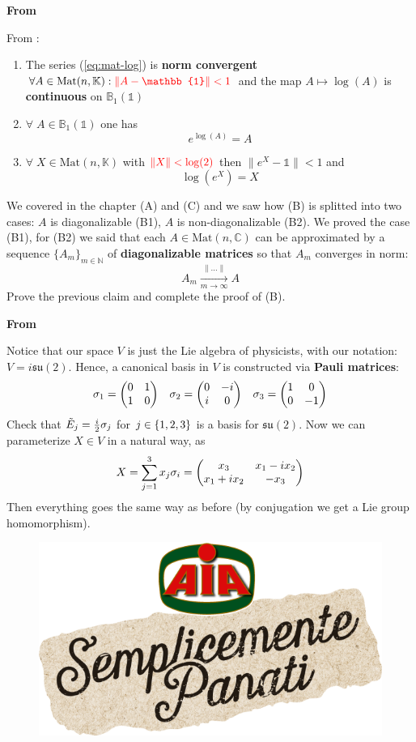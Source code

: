 \documentclass[../main.tex]{subfiles}
\begin{document}
\textbf{From }
\hline
\begin{starredExercise}
From : 
\renewcommand{\labelenumi}{\Alph{enumi})}
\begin{enumerate}
    \item The series (\ref{eq:mat-log}) is \textbf{norm convergent}\\ $\forall A\in\text{Mat}(n,\mathbb{K}): {\color{red}\lVert A-\mathbb{1}\rVert<1}$ and the map $A\mapsto\log(A)$ is \textbf{continuous} on $\mathbb{B}_1(\mathbb{1})$
    \item $\forall\;A\in\mathbb{B}_1(\mathbb{1})$ one has 
    \[
    e^{\log(A)}=A
    \]
    \item $\forall\;X\in\text{Mat}(n,\mathbb{K})$ with ${\color{red}\lVert X\rVert<\log(2)}$ then $\lVert e^X-\mathbb{1}\rVert<1$ and 
    \[
    \log(e^X)=X
    \]
\end{enumerate}
We covered in the chapter (A) and (C) and we saw how (B) is splitted into two cases: $A$ is diagonalizable (B1), $A$ is non-diagonalizable (B2). We proved the case (B1), for (B2) we said that each $A\in\text{Mat}(n,\mathbb{C})$ can be approximated by a sequence $\{A_m\}_{m\in\mathbb{N}}$ of \textbf{diagonalizable matrices} so that $A_m$ converges in norm:
\[
A_m\xrightarrow[m\to\infty]{\lVert\dots\rVert}A
\]
Prove the previous claim and complete the proof of (B).
\end{starredExercise}
\textbf{From }
\hline
\begin{starredExercise} Notice that our space $V$ is just the Lie algebra of physicists, with our notation: $V=i\mathfrak{su}(2)$. Hence, a canonical basis %
in $V$ is constructed via \textbf{Pauli matrices}:
\[
\sigma_1=\mqty(\admat[0]{1,1}) \quad \sigma_2=\mqty(\admat[0]{-i,i}) \quad \sigma_3=\mqty(\dmat[0]{1,-1})
\]
Check that $\Tilde{E}_j=\frac{i}{2}\sigma_j$ for $j\in\Bqty{1,2,3}$ is a basis for $\mathfrak{su}(2)$. Now we can parameterize $X\in V$ in a natural way, as
\[
X=\sum_{j=1}^3 x_j\sigma_i=\mqty(x_3 & x_1-ix_2 \\ x_1+ix_2 & -x_3)
\]
Then everything goes the same way as before (by conjugation we get a Lie group homomorphism).
\end{starredExercise}
\begin{figure}[h]
    \centering
    \includegraphics{images/semplicementepanati.png}
    \caption*{}
    \label{fig:my_label}
\end{figure}
\end{document}
